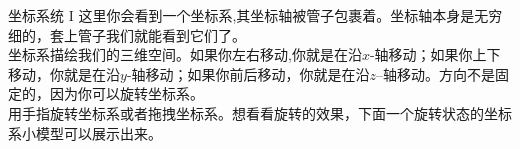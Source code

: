 ﻿\begin{surferPage}{坐标系统 I}
这里你会看到一个坐标系,其坐标轴被管子包裹着。坐标轴本身是无穷细的，套上管子我们就能看到它们了。\\
坐标系描绘我们的三维空间。如果你左右移动,你就是在沿$x$-轴移动；如果你上下移动，你就是在沿$y$-轴移动；如果你前后移动，你就是在沿$z$--轴移动。方向不是固定的，因为你可以旋转坐标系。\\
\vspace{0.3cm}
用手指旋转坐标系或者拖拽坐标系。想看看旋转的效果，下面一个旋转状态的坐标系小模型可以展示出来。
\end{surferPage}
